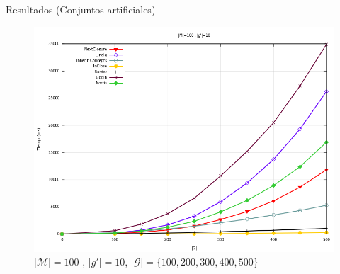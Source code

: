 \documentclass{beamer}
\newcommand{\M}{\mathcal{M}}
\newcommand{\G}{\mathcal{G}}
\begin{document}
\fi

  
    \begin{frame}{Resultados (Conjuntos artificiales)}
      \begin{figure}[H]
      \centering
      \includegraphics[scale=0.3]{images/M100g10G100500notadd.png}
      \caption{$|\M|=100$ , $|g'|=10$, $|\G|=\{100,200,300,400,500\}$}
     \end{figure}
  \end{frame}
  
\end{document}
